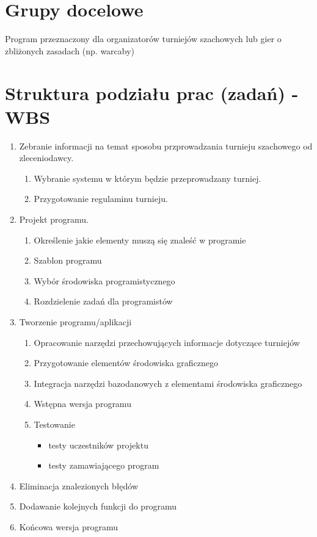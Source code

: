 \section{Grupy docelowe}
Program przeznaczony dla organizatorów turniejów szachowych lub gier o zbliżonych zasadach (np. warcaby)  


\section{Struktura podziału prac (zadań) - WBS}
\begin{enumerate}
\item Zebranie informacji na temat sposobu przprowadzania turnieju szachowego od zleceniodawcy.
\begin{enumerate}
	\item Wybranie systemu w którym będzie przeprowadzany turniej.
	\item Przygotowanie regulaminu turnieju.
\end{enumerate}
\item Projekt programu.
\begin{enumerate}
\item Określenie jakie elementy muszą się znaleść w programie
\item Szablon programu
\item Wybór środowiska programistycznego
\item Rozdzielenie zadań dla programistów
\end{enumerate}
\item Tworzenie programu/aplikacji
\begin{enumerate}
\item Opracowanie narzędzi przechowujących informacje dotyczące turniejów
\item Przygotowanie elementów środowiska graficznego
\item Integracja narzędzi bazodanowych z elementami środowiska graficznego
\item Wstępna wersja programu
\item Testowanie
\begin{itemize}
\item testy uczestników projektu
\item testy zamawiającego program
\end{itemize}

\end{enumerate}
\item Eliminacja znalezionych błędów
\item Dodawanie kolejnych funkcji do programu
\item Końcowa wersja programu

\end{enumerate}

